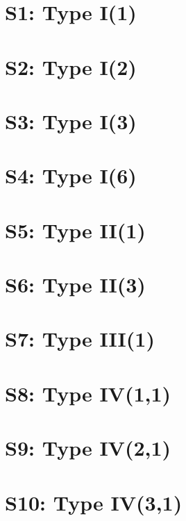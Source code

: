 \documentclass{article}
\begin{document}
\section{S1: Type I(1)}

\section{S2: Type I(2)}

\section{S3: Type I(3)}

\section{S4: Type I(6)}

\section{S5: Type II(1)}

\section{S6: Type II(3)}

\section{S7: Type III(1)}

\section{S8: Type IV(1,1)}

\section{S9: Type IV(2,1)}

\section{S10: Type IV(3,1)}
\end{document}
